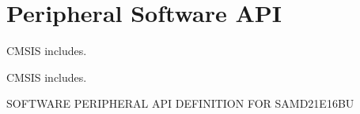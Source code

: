 \hypertarget{group___s_a_m_d21_e16_b_u__api}{}\section{Peripheral Software A\+PI}
\label{group___s_a_m_d21_e16_b_u__api}


C\+M\+S\+IS includes.  


C\+M\+S\+IS includes. 

S\+O\+F\+T\+W\+A\+RE P\+E\+R\+I\+P\+H\+E\+R\+AL A\+PI D\+E\+F\+I\+N\+I\+T\+I\+ON F\+OR S\+A\+M\+D21\+E16\+BU 